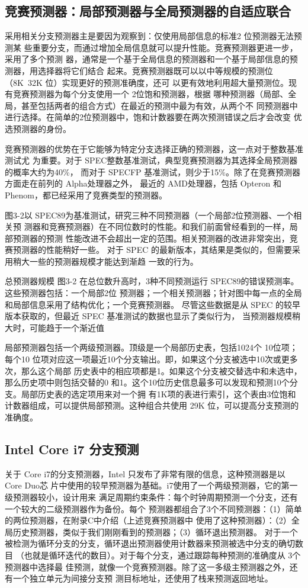 \subsection{竞赛预测器：局部预测器与全局预测器的自适应联合}
采用相关分支预测器主是要因为观察到：仅使用局部信息的标准2 位预测器无法预测某
些重要分支，而通过增加全局信息就可以提升性能。竞赛预测器更进一步，采用了多个预测
器，通常是一个基于全局信息的预测器和一个基于局部信息的预测器，用选择器将它们结合
起来。竞赛预测器既可以以中等规模的预测位（8K~32K 位）实现更好的预测准确度，还可
以更有效地利用超大量预测位。现有竞赛预测器为每个分支使用一个 2位饱和预测器，根据
哪种预测器（局部、全局，甚至包括两者的组合方式）在最近的预测中最为有效，从两个不
同预测器中进行选择。在简单的2位预测器中，饱和计数器要在两次预测错误之后才会改变
优选预测器的身份。

竞赛预测器的优势在于它能够为特定分支选择正确的预测器，这一点对于整数基准测试尤
为重要。对于 SPEC整数基准测试，典型竞赛预测器为其选择全局预测器的概率大约为40\%，
而对于 SPECFP 基准测试，则少于15\%。除了在竞赛预测器方面走在前列的 Alpha处理器之外，
最近的 AMD处理器，包括 Opteron 和 Phenom，都已经采用了竞赛类型的预测器。

图3-2以 SPEC89为基准测试，研究三种不同预测器（一个局部2位预测器、一个相关预
测器和竞赛预测器）在不同位数时的性能。和我们前面曾经看到的一样，局部预测器的预测
性能改进不会超出一定的范围。相关预测器的改进非常突出，竞赛预测器的性能稍好一些。
对于 SPEC 的最新版本，其结果是类似的，但需要采用稍大一些的预测器规模才能达到渐趋
一致的行为。

总预测器规模
图3-2 在总位数升高时，3种不同预测运行 SPEC89的错误预测率。这些预测器包括：一个局部2位
预测器；一个相关预测器；针对图中每一点的全局和局部信息采用了结构优化；一个竞赛预测器。
尽管这些数据是从 SPEC 的较早版本获取的，但最近 SPEC 基准测试的数据也显示了类似行为，
当预测器规模稍大时，可能趋于一个渐近值

局部预测器包括一个两级预测器。顶级是一个局部历史表，包括1024个 10位项；每个10
位项对应这一项最近10个分支输出。即，如果这个分支被选中10次或更多次，那么这个局部
历史表中的相应项都是1。如果这个分支被交替选中和未选中，那么历史项中则包括交替的0
和1。这个10位历史信息最多可以发现和预测10个分支。局部历史表的选定项用来对一个拥
有1K项的表进行索引，这个表由3位饱和计数器组成，可以提供局部预测。这种组合共使用
29K 位，可以提高分支预测的准确度。

\subsection{Intel Core i7 分支预测}
关于 Core i7的分支预测器，Intel 只发布了非常有限的信息，这种预测器是以 Core Duo芯
片中使用的较早预测器为基础。i7使用了一个两级预测器，它的第一级预测器较小，设计用来
满足周期约束条件：每个时钟周期预测一个分支，还有一个较大的二级预测器作为备份。每个
预测器都组合了3个不同预测器：（1）简单的两位预测器，在附录C中介绍（上述竞赛预测器中
使用了这种预测器）：（2）全局历史预测器，类似于我们刚刚看到的预测器；（3）循环退出预测器。
对于一个被检测为循环分支的分支，循环退出预测器使用计数器来预测被选中分支的确切数目
（也就是循环迭代的数目）。对于每个分支，通过跟踪每种预测的准确度从 3个预测器中选择最
佳预测，就像一个竞赛预测器。除了这一多级主预测器之外，还有一个独立单元为间接分支预
测目标地址，还使用了栈来预测返回地址。


